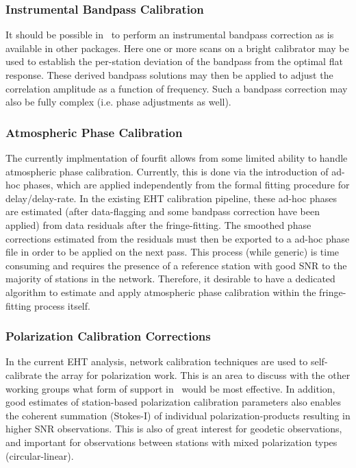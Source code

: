 \subsubsection{Instrumental Bandpass Calibration}
\label{sec:bandpass}
It should be possible in \nuHOPS~to perform an instrumental bandpass
correction as is available in other packages.  Here one or more scans
on a bright calibrator may be used to establish the per-station deviation
of the bandpass from the optimal flat response.  These derived bandpass
solutions may then be applied to adjust the correlation amplitude as a
function of frequency.  Such a bandpass correction  may also be fully
complex (i.e. phase adjustments as well).

\subsubsection{Atmospheric Phase Calibration}
\label{sec:atmosphere}

The currently implmentation of fourfit allows from some limited ability to handle atmospheric phase calibration. Currently, this is done via the introduction of ad-hoc phases, which are applied independently from the formal fitting procedure for delay/delay-rate.
In the existing EHT calibration pipeline, these ad-hoc phases are estimated (after data-flagging and some bandpass correction have been applied) from data residuals after the fringe-fitting. The smoothed phase corrections estimated from the residuals
must then be exported to a ad-hoc phase file in order to be applied on the next pass. This process (while generic) is time consuming and requires the presence of a reference station with good SNR to the majority of stations in the network. Therefore, it
desirable to have a dedicated algorithm to estimate and apply atmospheric phase calibration within the fringe-fitting process itself.


\subsubsection{Polarization Calibration Corrections}
\label{sec:polarization}
In the current EHT analysis, network calibration techniques are used to self-calibrate the array for polarization work.  This is an area
to discuss with the other working groups what form of support in \nuHOPS~would be most effective. In addition, good estimates of station-based polarization calibration parameters
also enables the coherent summation (Stokes-I) of individual polarization-products resulting in higher SNR observations. This is also of great interest for geodetic observations, and important
for observations between stations with mixed polarization types (circular-linear).

